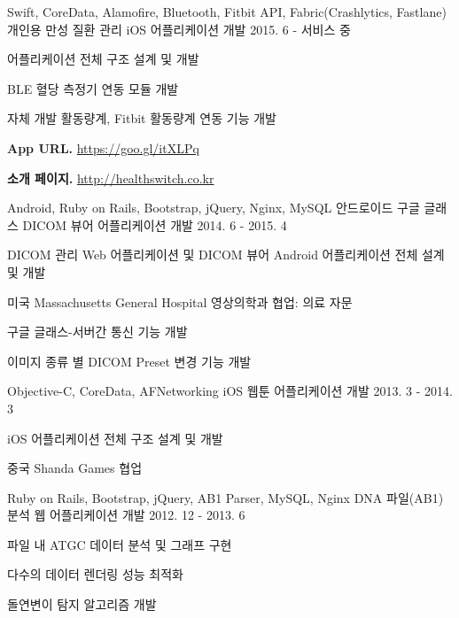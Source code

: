 \begin{cvexpentries}
  \cvexpentry
    {Swift, CoreData, Alamofire, Bluetooth, Fitbit API, Fabric(Crashlytics, Fastlane)}
    {개인용 만성 질환 관리 iOS 어플리케이션 개발}
    {2015. 6 - 서비스 중}
    {}
    {
        \begin{cvitems}
            \item {어플리케이션 전체 구조 설계 및 개발}
            \item {BLE 혈당 측정기 연동 모듈 개발}
            \item {자체 개발 활동량계, Fitbit 활동량계 연동 기능 개발}
            \item {\textbf{App URL.} \href{https://goo.gl/itXLPq}{https://goo.gl/itXLPq}}
            \item {\textbf{소개 페이지.} \href{http://healthswitch.co.kr/}{http://healthswitch.co.kr}}
        \end{cvitems}
    }
\end{cvexpentries}

\begin{cvexpentries}
  \cvexpentry
    {Android, Ruby on Rails, Bootstrap, jQuery, Nginx, MySQL}
    {안드로이드 구글 글래스 DICOM 뷰어 어플리케이션 개발}
    {2014. 6 - 2015. 4}
    {}
    {
        \begin{cvitems}
            \item {DICOM 관리 Web 어플리케이션 및 DICOM 뷰어 Android 어플리케이션 전체 설계 및 개발}
            \item {미국 Massachusetts General Hospital 영상의학과 협업: 의료 자문}
            \item {구글 글래스-서버간 통신 기능 개발}
            \item {이미지 종류 별 DICOM Preset 변경 기능 개발}
        \end{cvitems}
    }
\end{cvexpentries}

\begin{cvexpentries}
  \cvexpentry
    {Objective-C, CoreData, AFNetworking}
    {iOS 웹툰 어플리케이션 개발}
    {2013. 3 - 2014. 3}
    {}
    {
        \begin{cvitems}
            \item {iOS 어플리케이션 전체 구조 설계 및 개발}            
            \item {중국 Shanda Games 협업}
        \end{cvitems}
    }
\end{cvexpentries}

\begin{cvexpentries}
  \cvexpentry
    {Ruby on Rails, Bootstrap, jQuery, AB1 Parser, MySQL, Nginx}
    {DNA 파일(AB1) 분석 웹 어플리케이션 개발}
    {2012. 12 - 2013. 6}
    {}
    {
        \begin{cvitems}
            \item {파일 내 ATGC 데이터 분석 및 그래프 구현}
            \item {다수의 데이터 렌더링 성능 최적화}
            \item {돌연변이 탐지 알고리즘 개발}
        \end{cvitems}
    }
\end{cvexpentries}


